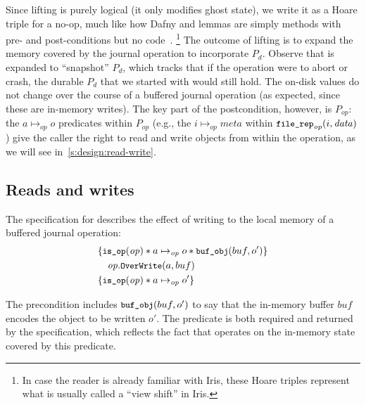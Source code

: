 Since lifting is purely logical (it only modifies ghost state), we
write it as a Hoare triple for a no-op, much like how Dafny and \fstar lemmas
are simply methods with pre- and post-conditions but no code~\cite[\S 12.2.3]{dafny-refman}.%
\footnote{In case the reader is already familiar with Iris, these Hoare triples represent
what is usually called a ``view shift'' in Iris.}
The outcome of lifting is to expand the memory covered by the journal operation to
incorporate $P_{d}$. Observe that \bufobjDurable is expanded to ``snapshot''
$P_{d}$, which tracks that if the operation were to abort or crash, the
durable $P_d$ that we started with would still hold.  The on-disk values
do not change over the course of a buffered journal operation (as expected, since these are
in-memory writes). The key part of the postcondition, however, is $P_{op}$: the
$a \mapsto_{op} o$ predicates within $P_{op}$ (e.g., the
$i \mapsto_{\mathit{op}} \mathit{meta}$ within $\cc{file_rep}_{\mathit{op}}(i, \mathit{data})$)
give the caller
the right to read and write objects from within the operation, as we will see
in~\autoref{s:design:read-write}.


\subsection{Reads and writes}
\label{s:design:read-write}

The specification for  describes the effect of writing to the
local memory of a buffered journal operation:
%
\begin{align*}
  \hoareV{\cc{is_op}(\mathit{op}) \sep a \mapsto_{\mathit{op}} o \sep \cc{buf_obj}(buf, o')}%
        {\mathit{op}.\cc{OverWrite}(a, buf)}%
        {\cc{is_op}(\mathit{op}) \sep a \mapsto_{\mathit{op}} o'}
\end{align*}

The precondition includes $\cc{buf_obj}(buf, o')$ to say that the in-memory
buffer $buf$ encodes the object to be written $o'$.
The  predicate is both
required and returned by the specification, which reflects the fact that
 operates on the in-memory state covered by
this predicate.

